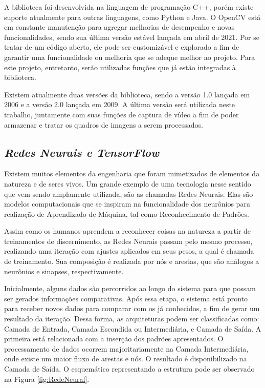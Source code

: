 A biblioteca foi desenvolvida na linguagem de programação C++, porém existe suporte atualmente para outras linguagens, como Python e Java. O OpenCV está em constante manutenção para agregar melhorias de desempenho e novas funcionalidades, sendo sua última versão estável lançada em abril de 2021. Por se tratar de um código aberto, ele pode ser customizável e explorado a fim de garantir uma funcionalidade ou melhoria que se adeque melhor ao projeto. Para este projeto, entretanto, serão utilizadas funções que já estão integradas à biblioteca.

Existem atualmente duas versões da biblioteca, sendo a versão 1.0 lançada em 2006 e a versão 2.0 lançada em 2009. A última versão será utilizada neste trabalho, juntamente com suas funções de captura de vídeo a fim de poder armazenar e tratar os quadros de imagens a serem processados.
 
\subsection{\textit{Redes Neurais e TensorFlow}}\label{sec:Cap3_D_TensorFlow}

Existem muitos elementos da engenharia que foram mimetizados de elementos da natureza e de seres vivos. Um grande exemplo de uma tecnologia nesse sentido que vem sendo amplamente utilizada, são as chamadas Redes Neurais. Elas são modelos computacionais que se inspiram na funcionalidade dos neurônios para realização de Aprendizado de Máquina, tal como Reconhecimento de Padrões.

Assim como os humanos aprendem a reconhecer coisas na natureza a partir de treinamentos de discernimento, as Redes Neurais passam pelo mesmo processo, realizando uma iteração com ajustes aplicados em seus pesos, a qual é chamada de treinamento. Sua composição é realizada por nós e arestas, que são análogos a neurônios e sinapses, respectivamente.

Inicialmente, alguns dados são percorridos ao longo do sistema para que possam ser gerados informações comparativas. Após essa etapa, o sistema está pronto para receber novos dados para comparar com os já conhecidos, a fim de gerar um resultado da iteração. Dessa forma, as arquiteturas podem ser classificadas como: Camada de Entrada, Camada Escondida ou Intermediária, e Camada de Saída. A primeira está relacionada com a inserção dos padrões apresentados. O processamento de dados ocorrem majoritariamente na Camada Intermediária, onde existe um maior fluxo de arestas e nós. O resultado é disponibilizado na Camada de Saída. O esquemático representando a estrutura pode ser observado na Figura \ref{fig:RedeNeural}.

